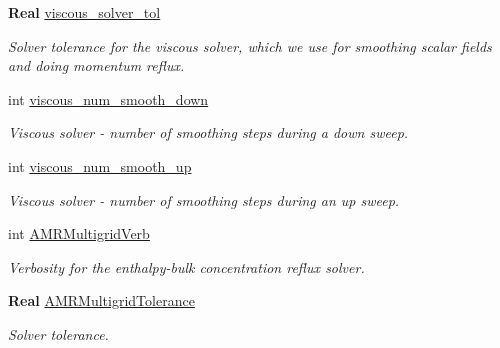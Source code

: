 \begin{DoxyCompactItemize}
\textbf{ Real} \hyperlink{struct_mushy_layer_options_aa8e946ee69340434302f12e9e5a18ac9}{viscous\+\_\+solver\+\_\+tol}
\begin{DoxyCompactList}\small\item\em Solver tolerance for the viscous solver, which we use for smoothing scalar fields and doing momentum reflux. \end{DoxyCompactList}\item 
\mbox{\label{struct_mushy_layer_options_a3e07f76a85fc4c1315e21ff48095866f}} 
int \hyperlink{struct_mushy_layer_options_a3e07f76a85fc4c1315e21ff48095866f}{viscous\+\_\+num\+\_\+smooth\+\_\+down}
\begin{DoxyCompactList}\small\item\em Viscous solver -\/ number of smoothing steps during a down sweep. \end{DoxyCompactList}\item 
\mbox{\label{struct_mushy_layer_options_a029c7a8e1f1ef35d4009dd39199fecc8}} 
int \hyperlink{struct_mushy_layer_options_a029c7a8e1f1ef35d4009dd39199fecc8}{viscous\+\_\+num\+\_\+smooth\+\_\+up}
\begin{DoxyCompactList}\small\item\em Viscous solver -\/ number of smoothing steps during an up sweep. \end{DoxyCompactList}\item 
\mbox{\label{struct_mushy_layer_options_a9fb4c8240d0388260d51c02cd6430ef8}} 
int \hyperlink{struct_mushy_layer_options_a9fb4c8240d0388260d51c02cd6430ef8}{A\+M\+R\+Multigrid\+Verb}
\begin{DoxyCompactList}\small\item\em Verbosity for the enthalpy-\/bulk concentration reflux solver. \end{DoxyCompactList}\item 
\mbox{\label{struct_mushy_layer_options_aa0df638b68484fc7c9b52ee3a702fd04}} 
\textbf{ Real} \hyperlink{struct_mushy_layer_options_aa0df638b68484fc7c9b52ee3a702fd04}{A\+M\+R\+Multigrid\+Tolerance}
\begin{DoxyCompactList}\small\item\em Solver tolerance. \end{DoxyCompactList}\item 

\end{DoxyCompactItemize}
